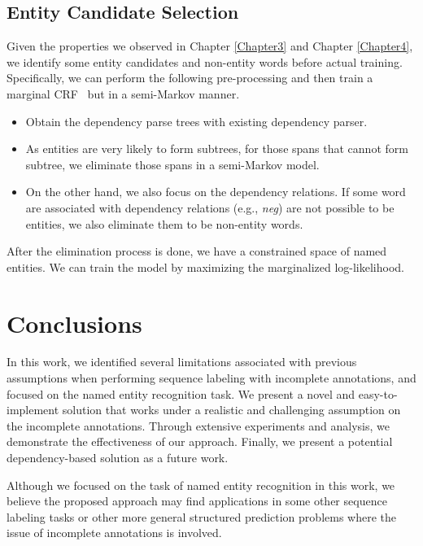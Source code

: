\subsection{Entity Candidate Selection}
Given the properties we observed in Chapter \ref{Chapter3} and Chapter \ref{Chapter4}, we identify some entity candidates and non-entity words before actual training. 
Specifically, we can perform the following pre-processing and then train a marginal CRF~\cite{greenberg2018marginal} but in a semi-Markov manner. 
\begin{itemize}
	\item Obtain the dependency parse trees with existing dependency parser.
	\item As entities are very likely to form subtrees, for those spans that cannot form subtree, we eliminate those spans in a semi-Markov model. 
	\item On the other hand, we also focus on the dependency relations. If some word are associated with dependency relations (e.g., \textit{neg}) are not possible to be entities, we also eliminate them to be non-entity words.
\end{itemize}

After the elimination process is done, we have a constrained space of named entities. 
We can train the model by maximizing  the marginalized log-likelihood.


\section{Conclusions}
In this work, we identified several limitations associated with previous assumptions when performing sequence labeling with incomplete annotations, and focused on the named entity recognition task.
We present a novel and easy-to-implement solution that works under a realistic and challenging assumption on the incomplete annotations.
Through extensive experiments and analysis, we demonstrate the effectiveness of our approach. 
Finally, we present a potential dependency-based solution as a future work. 

Although we focused on the task of named entity recognition in this work, we believe the proposed approach may find applications in some other  sequence labeling tasks or other more general structured prediction problems where the issue of incomplete annotations is involved.





